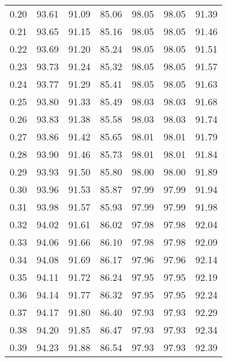\begin{tabular}{|c|c|c|c|c|c|c|}
      0.20 &     93.61 &     91.09 &      85.06 &   98.05 &      98.05 &         91.39 \\
      0.21 &     93.65 &     91.15 &      85.16 &   98.05 &      98.05 &         91.46 \\
      0.22 &     93.69 &     91.20 &      85.24 &   98.05 &      98.05 &         91.51 \\
      0.23 &     93.73 &     91.24 &      85.32 &   98.05 &      98.05 &         91.57 \\
      0.24 &     93.77 &     91.29 &      85.41 &   98.05 &      98.05 &         91.63 \\
      0.25 &     93.80 &     91.33 &      85.49 &   98.03 &      98.03 &         91.68 \\
      0.26 &     93.83 &     91.38 &      85.58 &   98.03 &      98.03 &         91.74 \\
      0.27 &     93.86 &     91.42 &      85.65 &   98.01 &      98.01 &         91.79 \\
      0.28 &     93.90 &     91.46 &      85.73 &   98.01 &      98.01 &         91.84 \\
      0.29 &     93.93 &     91.50 &      85.80 &   98.00 &      98.00 &         91.89 \\
      0.30 &     93.96 &     91.53 &      85.87 &   97.99 &      97.99 &         91.94 \\
      0.31 &     93.98 &     91.57 &      85.93 &   97.99 &      97.99 &         91.98 \\
      0.32 &     94.02 &     91.61 &      86.02 &   97.98 &      97.98 &         92.04 \\
      0.33 &     94.06 &     91.66 &      86.10 &   97.98 &      97.98 &         92.09 \\
      0.34 &     94.08 &     91.69 &      86.17 &   97.96 &      97.96 &         92.14 \\
      0.35 &     94.11 &     91.72 &      86.24 &   97.95 &      97.95 &         92.19 \\
      0.36 &     94.14 &     91.77 &      86.32 &   97.95 &      97.95 &         92.24 \\
      0.37 &     94.17 &     91.80 &      86.40 &   97.93 &      97.93 &         92.29 \\
      0.38 &     94.20 &     91.85 &      86.47 &   97.93 &      97.93 &         92.34 \\
      0.39 &     94.23 &     91.88 &      86.54 &   97.93 &      97.93 &         92.39 \\

\end{tabular}
